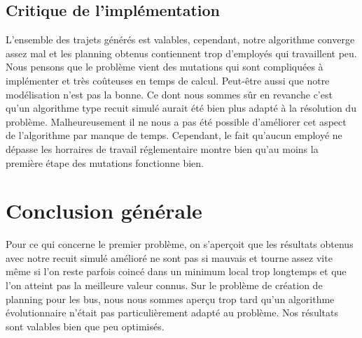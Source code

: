 \documentclass{report}
\begin{document}
\section{Critique de l'implémentation}

L'ensemble des trajets générés est valables, cependant, notre algorithme converge assez mal et les planning obtenus
contiennent trop d'employés qui travaillent peu. Nous pensons que le problème vient des mutations qui sont compliquées à
implémenter et très coûteuses en temps de calcul. Peut-être aussi que notre modélisation n'est pas la bonne. Ce dont
nous sommes sûr en revanche c'est qu'un algorithme type recuit simulé aurait été bien plus adapté à la résolution du
problème. Malheureusement il ne nous a pas été possible d'améliorer cet aspect
de l'algorithme par manque de temps. Cependant, le fait qu'aucun employé ne dépasse les horraires de travail
réglementaire montre bien qu'au moins la première étape des mutations fonctionne bien.

\chapter{Conclusion générale}
Pour ce qui concerne le premier problème, on s'aperçoit que les résultats obtenus avec notre recuit simulé amélioré ne sont pas si mauvais et tourne assez vite même si l'on reste parfois coincé dans un minimum local trop longtemps et que l'on atteint pas la meilleure valeur connus.
Sur le problème de création de planning pour les bus, nous nous sommes aperçu trop tard qu'un algorithme évolutionnaire
n'était pas particulièrement adapté au problème. Nos résultats sont valables bien que peu optimisés.
\end{document}
